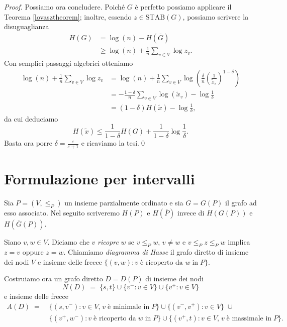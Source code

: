 \begin{proof}
  Possiamo ora concludere. Poiché \(G\) è perfetto possiamo applicare il Teorema \ref{lovasztheorem}; inoltre, essendo \(z\in\text{STAB}(G)\), possiamo scrivere la disuguaglianza 
  \begin{align}
    H(G)&=\log(n)-H(\overline{G}) \nonumber \\
    &\ge \log(n) + \frac{1}{n}\sum_{v\in V}{\log{z_v}}.\nonumber 
  \end{align}
  Con semplici passaggi algebrici otteniamo 
  \begin{align}
    \log(n) + \frac{1}{n}\sum_{v\in V}{\log{z_v}} &= \log(n) + \frac{1}{n}\sum_{v\in V}{\log\left(\frac{\delta}{n}\left(\frac{1}{\tilde{x}_v}\right)^{1-\delta}\right)} \nonumber \\
    &= - \frac{1-\delta}{n}\sum_{v\in V}{\log(\tilde{x}_v)}-\log{\frac{1}{\delta}} \nonumber \\
    &= (1-\delta)H(\tilde{x})-\log{\frac{1}{\delta}} \nonumber, 
  \end{align}
  da cui deduciamo
  \[H(\tilde{x})\le\frac{1}{1-\delta}H(G)+\frac{1}{1-\delta}\log{\frac{1}{\delta}}.\]
  Basta ora porre \(\delta=\frac{\varepsilon}{\varepsilon+1}\) e ricaviamo la tesi.\qed
\end{proof}

\section{Formulazione per intervalli}

Sia \(P=(V, \le_{P})\) un insieme parzialmente ordinato e sia \(G=G(P)\) il grafo ad esso associato. Nel seguito scriveremo \(H(P)\) e \(H(\overline{P})\)   invece di \(H(G(P))\) e \(H(\overline{G}(P))\).

Siano \(v,w\in V\). Diciamo che \(v\) \emph{ricopre} \(w\) se \(v\le_{P} w\), \(v\neq w\) e \(v\le_{P}z\le_{P}w\) implica \(z=v\) oppure \(z=w\). Chiamiamo \emph{diagramma di Hasse} il grafo diretto di insieme dei nodi \(V\) e insieme delle frecce \(\{(v,w):v\;\text{è ricoperto da }w\;\text{in}\;P\}\).

Costruiamo ora un grafo diretto \(D=D(P)\) di insieme dei nodi
\[
  N(D)\;=\;\{s,t\}\cup\{v^-:v\in V\}\cup\{v^+:v\in V\}
\]
e insieme delle frecce
\begin{align}
  A(D)\;=\;&\{(s,v^-):v\in V\text{,}\;v\;\text{è minimale in}\; P\}\cup\{(v^-,v^+):v\in V\}\;\cup \nonumber \\
  &\{(v^+,w^-):v\;\text{è ricoperto da}\;w\;\text{in}\;P\}\cup\{(v^+,t):v\in V\text{,}\;v\;\text{è massimale in}\;P\}\text{.} \nonumber
\end{align}

